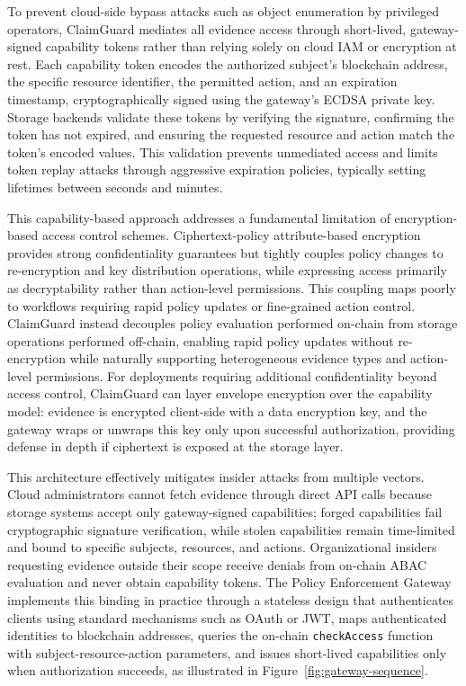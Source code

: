 \documentclass[final,5p,times,twocolumn]{elsarticle}
\begin{document}
To prevent cloud-side bypass attacks such as object enumeration by privileged operators, ClaimGuard mediates all evidence access through short-lived, gateway-signed capability tokens rather than relying solely on cloud IAM or encryption at rest. Each capability token encodes the authorized subject's blockchain address, the specific resource identifier, the permitted action, and an expiration timestamp, cryptographically signed using the gateway's ECDSA private key. Storage backends validate these tokens by verifying the signature, confirming the token has not expired, and ensuring the requested resource and action match the token's encoded values. This validation prevents unmediated access and limits token replay attacks through aggressive expiration policies, typically setting lifetimes between seconds and minutes.

This capability-based approach addresses a fundamental limitation of encryption-based access control schemes. Ciphertext-policy attribute-based encryption provides strong confidentiality guarantees but tightly couples policy changes to re-encryption and key distribution operations, while expressing access primarily as decryptability rather than action-level permissions. This coupling maps poorly to workflows requiring rapid policy updates or fine-grained action control. ClaimGuard instead decouples policy evaluation performed on-chain from storage operations performed off-chain, enabling rapid policy updates without re-encryption while naturally supporting heterogeneous evidence types and action-level permissions. For deployments requiring additional confidentiality beyond access control, ClaimGuard can layer envelope encryption over the capability model: evidence is encrypted client-side with a data encryption key, and the gateway wraps or unwraps this key only upon successful authorization, providing defense in depth if ciphertext is exposed at the storage layer.

This architecture effectively mitigates insider attacks from multiple vectors. Cloud administrators cannot fetch evidence through direct API calls because storage systems accept only gateway-signed capabilities; forged capabilities fail cryptographic signature verification, while stolen capabilities remain time-limited and bound to specific subjects, resources, and actions. Organizational insiders requesting evidence outside their scope receive denials from on-chain ABAC evaluation and never obtain capability tokens. The Policy Enforcement Gateway implements this binding in practice through a stateless design that authenticates clients using standard mechanisms such as OAuth or JWT, maps authenticated identities to blockchain addresses, queries the on-chain \texttt{checkAccess} function with subject-resource-action parameters, and issues short-lived capabilities only when authorization succeeds, as illustrated in Figure~\ref{fig:gateway-sequence}.
\end{document}
